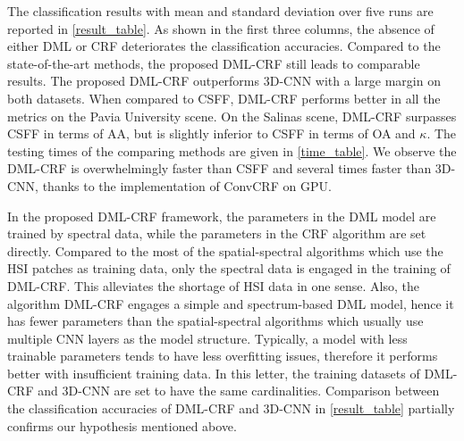 \documentclass[]{article}
\newcommand{\red}{\color{black}}
\newcommand{\magentaso}{\color{black}}
\newcommand{\violetso}{\color{black}}
\begin{document}
The classification results with mean and standard deviation over five runs {\red are} reported in \cref{result_table}. As shown in the first three columns, the absence of either DML or CRF deteriorates the classification accuracies.
Compared to the state-of-the-art methods, the proposed DML-CRF still leads to comparable results.
{\red The proposed DML-CRF outperforms $3$D-CNN with a large margin on both datasets.}
When compared to CSFF, DML-CRF performs better in all the metrics
on the Pavia University scene.
{\red
On the Salinas scene, DML-CRF {\red surpasses} CSFF in terms of AA, but is slightly inferior to CSFF in terms of OA and $\kappa$.}
The testing {\magentaso times of the comparing methods are} given in \cref{time_table}.
We observe the DML-CRF is overwhelmingly faster than CSFF and several times faster than  $3$D-CNN, thanks to the implementation of ConvCRF on
GPU. 

{\violetso 
In the proposed DML-CRF framework, the parameters in the DML model are trained by spectral data, 
while the parameters in the CRF algorithm are set directly. 
Compared to the most of the spatial-spectral algorithms which use the HSI patches as training data, 
only the spectral data is engaged in the training of DML-CRF. This alleviates the shortage of 
HSI data in one sense. Also, the algorithm DML-CRF engages a simple and spectrum-based DML model, 
hence it has fewer parameters than the spatial-spectral algorithms which usually use 
multiple CNN layers as the model structure. 
Typically, a model with less trainable parameters 
tends to have less overfitting issues, therefore it performs better with insufficient training data. 
In this letter, the training datasets of DML-CRF and $3$D-CNN are set to have the same 
cardinalities. 
Comparison between the classification accuracies of DML-CRF and $3$D-CNN in \cref{result_table} 
partially confirms our hypothesis mentioned above.
}
\end{document}

